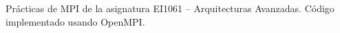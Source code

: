 Prácticas de M\-P\-I de la asignatura E\-I1061 -- Arquitecturas Avanzadas. Código implementado usando Open\-M\-P\-I. 